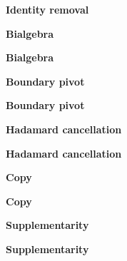 \documentclass{article}
\begin{document}
\clearpage
\begin{center}
\textbf{Identity removal}\par\medskip

\end{center}
\clearpage
\begin{center}
\textbf{Bialgebra}\par\medskip

\end{center}
\clearpage
\begin{center}
\textbf{Bialgebra}\par\medskip

\end{center}
\clearpage
\begin{center}
\textbf{Boundary pivot}\par\medskip

\end{center}
\clearpage
\begin{center}
\textbf{Boundary pivot}\par\medskip

\end{center}
\clearpage
\begin{center}
\textbf{Hadamard cancellation}\par\medskip

\end{center}
\clearpage
\begin{center}
\textbf{Hadamard cancellation}\par\medskip

\end{center}
\clearpage
\begin{center}
\textbf{Copy}\par\medskip

\end{center}
\clearpage
\begin{center}
\textbf{Copy}\par\medskip

\end{center}
\clearpage
\begin{center}
\textbf{Supplementarity}\par\medskip

\end{center}
\clearpage
\begin{center}
\textbf{Supplementarity}\par\medskip

\end{center}
\end{document}

